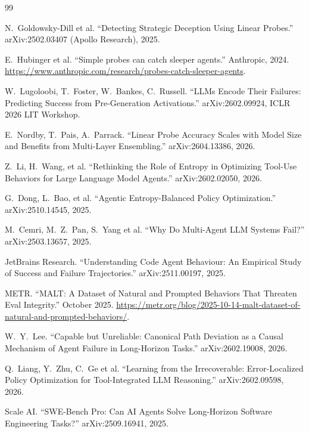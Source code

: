 \documentclass[11pt]{article}
\begin{document}


\begin{thebibliography}{99}

N.~Goldowsky-Dill et al.
``Detecting Strategic Deception Using Linear Probes.'' arXiv:2502.03407 (Apollo Research), 2025.

E.~Hubinger et al.
``Simple probes can catch sleeper agents.'' Anthropic, 2024.
\url{https://www.anthropic.com/research/probes-catch-sleeper-agents}.

W.~Lugoloobi, T.~Foster, W.~Bankes, C.~Russell.
``LLMs Encode Their Failures: Predicting Success from Pre-Generation Activations.'' arXiv:2602.09924, ICLR 2026 LIT Workshop.

E.~Nordby, T.~Pais, A.~Parrack.
``Linear Probe Accuracy Scales with Model Size and Benefits from Multi-Layer Ensembling.'' arXiv:2604.13386, 2026.

Z.~Li, H.~Wang, et al.
``Rethinking the Role of Entropy in Optimizing Tool-Use Behaviors for Large Language Model Agents.'' arXiv:2602.02050, 2026.

G.~Dong, L.~Bao, et al.
``Agentic Entropy-Balanced Policy Optimization.'' arXiv:2510.14545, 2025.

M.~Cemri, M.~Z.~Pan, S.~Yang et al.
``Why Do Multi-Agent LLM Systems Fail?'' arXiv:2503.13657, 2025.

JetBrains Research.
``Understanding Code Agent Behaviour: An Empirical Study of Success and Failure Trajectories.'' arXiv:2511.00197, 2025.

METR.
``MALT: A Dataset of Natural and Prompted Behaviors That Threaten Eval Integrity.'' October 2025.
\url{https://metr.org/blog/2025-10-14-malt-dataset-of-natural-and-prompted-behaviors/}.

W.~Y.~Lee.
``Capable but Unreliable: Canonical Path Deviation as a Causal Mechanism of Agent Failure in Long-Horizon Tasks.'' arXiv:2602.19008, 2026.

Q.~Liang, Y.~Zhu, C.~Ge et al.
``Learning from the Irrecoverable: Error-Localized Policy Optimization for Tool-Integrated LLM Reasoning.'' arXiv:2602.09598, 2026.

Scale AI.
``SWE-Bench Pro: Can AI Agents Solve Long-Horizon Software Engineering Tasks?'' arXiv:2509.16941, 2025.


\end{thebibliography}
\end{document}
